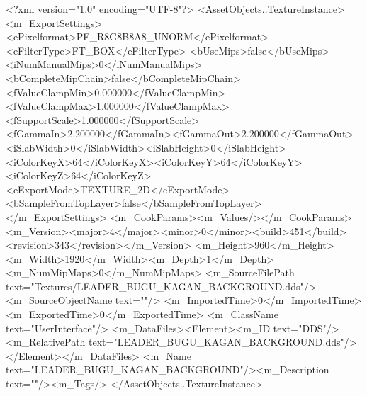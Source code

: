 <?xml version="1.0" encoding="UTF-8"?>
<AssetObjects..TextureInstance>
  <m_ExportSettings>
    <ePixelformat>PF_R8G8B8A8_UNORM</ePixelformat><eFilterType>FT_BOX</eFilterType>
    <bUseMips>false</bUseMips><iNumManualMips>0</iNumManualMips><bCompleteMipChain>false</bCompleteMipChain>
    <fValueClampMin>0.000000</fValueClampMin><fValueClampMax>1.000000</fValueClampMax><fSupportScale>1.000000</fSupportScale>
    <fGammaIn>2.200000</fGammaIn><fGammaOut>2.200000</fGammaOut><iSlabWidth>0</iSlabWidth><iSlabHeight>0</iSlabHeight>
    <iColorKeyX>64</iColorKeyX><iColorKeyY>64</iColorKeyY><iColorKeyZ>64</iColorKeyZ>
    <eExportMode>TEXTURE_2D</eExportMode><bSampleFromTopLayer>false</bSampleFromTopLayer>
  </m_ExportSettings>
  <m_CookParams><m_Values/></m_CookParams>
  <m_Version><major>4</major><minor>0</minor><build>451</build><revision>343</revision></m_Version>
  <m_Height>960</m_Height><m_Width>1920</m_Width><m_Depth>1</m_Depth><m_NumMipMaps>0</m_NumMipMaps>
  <m_SourceFilePath text="Textures/LEADER_BUGU_KAGAN_BACKGROUND.dds"/><m_SourceObjectName text=""/>
  <m_ImportedTime>0</m_ImportedTime><m_ExportedTime>0</m_ExportedTime>
  <m_ClassName text="UserInterface"/>
  <m_DataFiles><Element><m_ID text="DDS"/><m_RelativePath text="LEADER_BUGU_KAGAN_BACKGROUND.dds"/></Element></m_DataFiles>
  <m_Name text="LEADER_BUGU_KAGAN_BACKGROUND"/><m_Description text=""/><m_Tags/>
</AssetObjects..TextureInstance>
